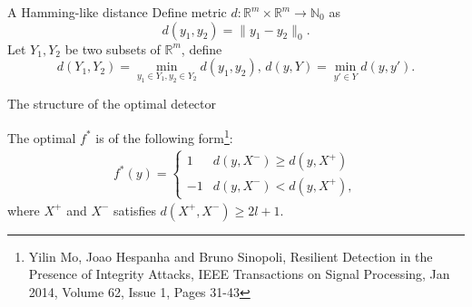\documentclass[10pt]{beamer}
\begin{document}
\begin{frame}{A Hamming-like distance}
  Define metric $d:\mathbb R^m\times \mathbb R^m\rightarrow \mathbb N_0$ as
  \begin{displaymath}
    d(y_1,y_2)=\|y_1-y_2\|_0. 
  \end{displaymath}
  Let $Y_1,Y_2$ be two subsets of $\mathbb R^m$, define
  \begin{displaymath}
    d(Y_1,Y_2) = \min_{y_1\in Y_1,y_2\in Y_2}d(y_1,y_2),\,d(y,Y) =  \min_{y'\in Y}d(y,y').
  \end{displaymath}

\end{frame}

\begin{frame}{The structure of the optimal detector}
  \begin{theorem}
    The optimal $f^*$ is of the following form\footnote{Yilin Mo, Joao Hespanha and Bruno Sinopoli, Resilient Detection in the Presence of Integrity Attacks, IEEE Transactions on Signal Processing, Jan 2014, Volume 62, Issue 1, Pages 31-43 }:
    \begin{align*}
      f^*(y) = \begin{cases}
	1 & d(y,X^-)\ge d(y,X^+)\\
	-1 & d(y,X^-)< d(y,X^+),
      \end{cases}
    \end{align*}
    where $X^{+}$ and $X^{-}$ satisfies $d(X^+,X^-)\geq 2l+1$.
  \end{theorem}
\end{frame}
\end{document}
